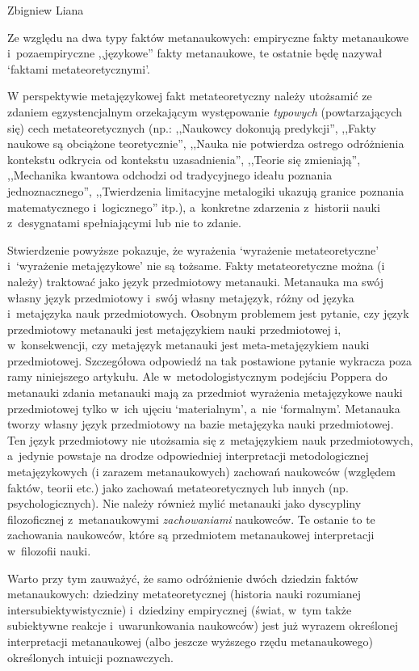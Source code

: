 \begin{artplenv}{Zbigniew Liana}
\begin{uwaga}
Ze względu na dwa typy faktów metanaukowych: empiryczne fakty metanaukowe i~pozaempiryczne ,,językowe'' fakty metanaukowe,
te ostatnie będę nazywał `faktami metateoretycznymi'.

W perspektywie metajęzykowej fakt metateoretyczny należy utożsamić ze zdaniem egzystencjalnym orzekającym występowanie
\textit{typowych} (powtarzających się) cech metateoretycznych (np.: ,,Naukowcy dokonują predykcji'', ,,Fakty naukowe są
obciążone teoretycznie'', ,,Nauka nie potwierdza ostrego odróżnienia kontekstu odkrycia od kontekstu uzasadnienia'',
,,Teorie się zmieniają'', ,,Mechanika kwantowa odchodzi od tradycyjnego ideału poznania jednoznacznego'', ,,Twierdzenia
limitacyjne metalogiki ukazują granice poznania matematycznego i~logicznego'' itp.), a~konkretne zdarzenia z~historii
nauki z~desygnatami spełniającymi lub nie to zdanie. 

Stwierdzenie powyższe pokazuje, że wyrażenia `wyrażenie metateoretyczne' i~`wyrażenie metajęzykowe' nie są tożsame.
Fakty metateoretyczne można (i należy) traktować jako język przedmiotowy metanauki. Metanauka ma swój własny język
przedmiotowy i~swój własny metajęzyk, różny od języka i~metajęzyka nauk przedmiotowych. Osobnym problemem jest pytanie,
czy język przedmiotowy metanauki jest metajęzykiem nauki przedmiotowej i, w~konsekwencji, czy metajęzyk metanauki jest
meta-metajęzykiem nauki przedmiotowej. Szczegółowa odpowiedź na tak postawione pytanie wykracza poza ramy niniejszego
artykułu. Ale w~metodologistycznym podejściu Poppera do metanauki zdania metanauki mają za przedmiot wyrażenia
metajęzykowe nauki przedmiotowej tylko w~ich ujęciu `materialnym', a~nie `formalnym'. Metanauka tworzy własny język
przedmiotowy na bazie metajęzyka nauki przedmiotowej. Ten język przedmiotowy nie utożsamia się z~metajęzykiem nauk
przedmiotowych, a~jedynie powstaje na drodze odpowiedniej interpretacji metodologicznej metajęzykowych (i zarazem
metanaukowych) zachowań naukowców (względem faktów, teorii etc.) jako zachowań metateoretycznych lub innych (np.
psychologicznych). Nie należy również mylić metanauki jako dyscypliny filozoficznej z~metanaukowymi \textit{zachowaniami}
naukowców. Te ostanie to te zachowania naukowców, które są przedmiotem metanaukowej interpretacji w~filozofii nauki.

Warto przy tym zauważyć, że samo odróżnienie dwóch dziedzin faktów metanaukowych: dziedziny metateoretycznej (historia
nauki rozumianej intersubiektywistycznie) i~dziedziny empirycznej (świat, w~tym także subiektywne reakcje i~uwarunkowania
naukowców) jest już wyrazem określonej interpretacji metanaukowej (albo jeszcze wyższego rzędu
metanaukowego) określonych intuicji poznawczych.
\end{uwaga}


\end{artplenv}
